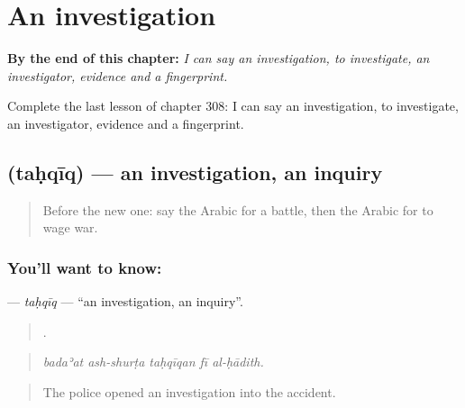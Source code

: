 
\chapter{An investigation}
\label{ch:ar-an-investigation}

\begin{chapteropening}
\textbf{By the end of this chapter:} \emph{I can say an investigation, to investigate, an investigator, evidence and a fingerprint.}

Complete the last lesson of chapter 308: I can say an investigation, to investigate, an investigator, evidence and a fingerprint.
\end{chapteropening}

\section[\texorpdfstring{\ar{تحقيق} (taḥqīq)}{تحقيق (taḥqīq)}]{ (taḥqīq) — an investigation, an inquiry}

\label{lesson:AR-C308-tahqiq}



\begin{quote}
Before the new one: say the Arabic for a battle, then the Arabic for to wage war.
\end{quote}

\subsection*{You'll want to know: }
\textbf{} — \emph{taḥqīq} — \textquotedblleft{}an investigation, an inquiry\textquotedblright{}.

\begin{quote}
    .
\end{quote}

\begin{quote}
\emph{badaʾat ash-shurṭa taḥqīqan fī al-ḥādith.}
\end{quote}

\begin{quote}
The police opened an investigation into the accident.
\end{quote}

